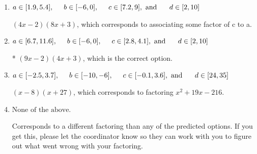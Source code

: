 \documentclass{extbook}[14pt]
\begin{document}
\begin{enumerate}
{\begin{enumerate}[label=\Alph*.]
 $(27x -2)(x + 3)$, which corresponds to associating some factor of a to c.
\item \( a \in [1.9, 5.4], \hspace*{5mm} b \in [-6, 0], \hspace*{5mm} c \in [7.2, 9], \text{ and } \hspace*{5mm} d \in [2, 10] \)

 $(4x -2)(8x + 3)$, which corresponds to associating some factor of c to a.
\item \( a \in [6.7, 11.6], \hspace*{5mm} b \in [-6, 0], \hspace*{5mm} c \in [2.8, 4.1], \text{ and } \hspace*{5mm} d \in [2, 10] \)

* $(9x -2)(4x + 3)$, which is the correct option.
\item \( a \in [-2.5, 3.7], \hspace*{5mm} b \in [-10, -6], \hspace*{5mm} c \in [-0.1, 3.6], \text{ and } \hspace*{5mm} d \in [24, 35] \)

 $(x -8)(x + 27)$, which corresponds to factoring $x^{2} +19 x -216$.
\item \( \text{None of the above.} \)

 Corresponds to a different factoring than any of the predicted options. If you get this, please let the coordinator know so they can work with you to figure out what went wrong with your factoring.
\end{enumerate}

}
\end{enumerate}
\end{document}
